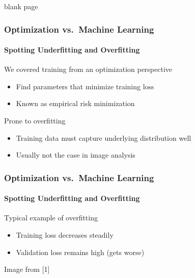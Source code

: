 \documentclass[xetex,professionalfont]{beamer}
\renewcommand\emph[1]{\textcolor{tuwcvl_cvl_blue}{#1}}
\begin{document}
{
\begin{frame}


\begin{center}
\textcolor[rgb]{0.9,0.9,0.9}{blank page}
\end{center}

\end{frame}
}


\begin{frame}
\frametitle{Optimization vs.~Machine Learning}
\framesubtitle{Spotting Underfitting and Overfitting}

We covered training from an optimization perspective
\begin{itemize}
    \item Find parameters that minimize training loss
    \item Known as \emph{empirical risk minimization} %
\end{itemize}

\bigskip

Prone to overfitting
\begin{itemize}
    \item Training data must capture underlying distribution well
    \item Usually not the case in image analysis
\end{itemize}

\end{frame}


\begin{frame}
\frametitle{Optimization vs.~Machine Learning}
\framesubtitle{Spotting Underfitting and Overfitting}

Typical example of \emph{overfitting}
\begin{itemize}
    \item Training loss decreases steadily
    \item Validation loss remains high (gets worse)
\end{itemize}

\smallskip

\begin{center}
{\centering Image from [1]}
\end{center}

\end{frame}
\end{document}

